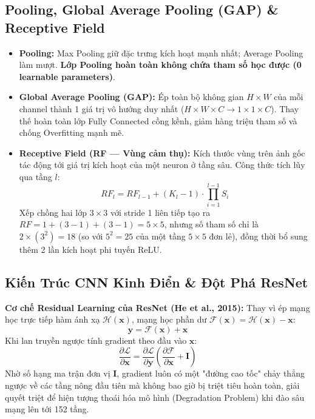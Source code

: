 \documentclass[10pt,a4paper]{article}
\begin{document}
\subsection{Pooling, Global Average Pooling (GAP) \& Receptive Field}
\begin{itemize}[leftmargin=*]
    \item \textbf{Pooling:} Max Pooling giữ đặc trưng kích hoạt mạnh nhất; Average Pooling làm mượt. \textbf{Lớp Pooling hoàn toàn không chứa tham số học được (0 learnable parameters)}.
    \item \textbf{Global Average Pooling (GAP):} Ép toàn bộ không gian $H \times W$ của mỗi channel thành 1 giá trị vô hướng duy nhất ($H \times W \times C \to 1 \times 1 \times C$). Thay thế hoàn toàn lớp Fully Connected cồng kềnh, giảm hàng triệu tham số và chống Overfitting mạnh mẽ.
    \item \textbf{Receptive Field (RF --- Vùng cảm thụ):} Kích thước vùng trên ảnh gốc tác động tới giá trị kích hoạt của một neuron ở tầng sâu. Công thức tích lũy qua tầng $l$:
    \begin{equation}
        RF_l = RF_{l-1} + (K_l - 1) \cdot \prod_{i=1}^{l-1} S_i
    \end{equation}
    Xếp chồng hai lớp $3 \times 3$ với stride 1 liên tiếp tạo ra $RF = 1 + (3-1) + (3-1) = 5 \times 5$, nhưng số tham số chỉ là $2 \times (3^2) = 18$ (so với $5^2 = 25$ của một tầng $5 \times 5$ đơn lẻ), đồng thời bổ sung thêm 2 lần kích hoạt phi tuyến ReLU.
\end{itemize}

\subsection{Kiến Trúc CNN Kinh Điển \& Đột Phá ResNet}
\textbf{Cơ chế Residual Learning của ResNet (He et al., 2015):}
Thay vì ép mạng học trực tiếp hàm ánh xạ $\mathcal{H}(\mathbf{x})$, mạng học phần dư $\mathcal{F}(\mathbf{x}) = \mathcal{H}(\mathbf{x}) - \mathbf{x}$:
\begin{equation}
    \mathbf{y} = \mathcal{F}(\mathbf{x}) + \mathbf{x}
\end{equation}
Khi lan truyền ngược tính gradient theo đầu vào $\mathbf{x}$:
\begin{equation}
    \frac{\partial \mathcal{L}}{\partial \mathbf{x}} = \frac{\partial \mathcal{L}}{\partial \mathbf{y}} \left( \frac{\partial \mathcal{F}}{\partial \mathbf{x}} + \mathbf{I} \right)
\end{equation}
Nhờ số hạng ma trận đơn vị $\mathbf{I}$, gradient luôn có một "đường cao tốc" chảy thẳng ngược về các tầng nông đầu tiên mà không bao giờ bị triệt tiêu hoàn toàn, giải quyết triệt để hiện tượng thoái hóa mô hình (Degradation Problem) khi đào sâu mạng lên tới 152 tầng.
\end{document}
